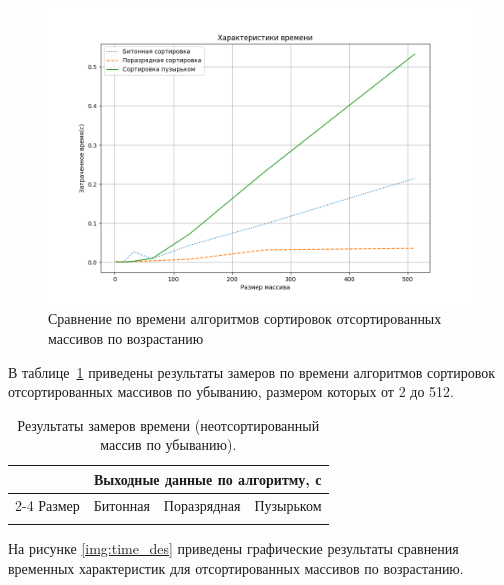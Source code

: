 \begin{figure}[h]
	\begin{center}
		\includegraphics[scale=0.6]{img/time_ins.png}
	\end{center}
	\captionsetup{justification=centering}
	\caption{Сравнение по времени алгоритмов сортировок отсортированных массивов по возрастанию}
	\label{img:time_ins}
\end{figure}
\clearpage
В таблице~\ref{tbl:des} приведены результаты замеров по времени алгоритмов сортировок отсортированных массивов по убыванию, размером которых от 2 до 512. 
\begin{table}[h]
	\begin{center}
		\begin{threeparttable}
			\captionsetup{justification=raggedright,singlelinecheck=off}
			\caption{Результаты замеров времени (неотсортированный массив по убыванию).}
			\label{tbl:des}
			\begin{tabular}{|c|c|c|c|}
				\hline
				& \multicolumn{3}{c|}{\bfseries Выходные данные по алгоритму, с} \\\cline{2-4}
				Размер & Битонная & Поразрядная  & Пузырьком  
				\csvreader{time_des.csv}{}
				{\\\hline\csvcoli & \csvcolii & \csvcoliii & \csvcoliv} \\
				\hline
			\end{tabular}
		\end{threeparttable}
	\end{center}
\end{table}

На рисунке \ref{img:time_des} приведены графические результаты сравнения временных характеристик для отсортированных массивов по возрастанию.

